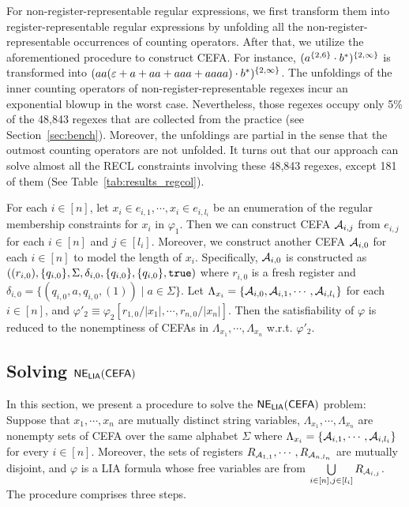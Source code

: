 For non-register-representable regular expressions, we first transform them into register-representable regular expressions by unfolding all the non-register-representable occurrences of counting operators. After that, we utilize the aforementioned procedure to construct CEFA. For instance, $(a^{\{2, 6\}} \cdot b^*)^{\{2,\infty\}}$ is transformed into $(aa(\varepsilon + a + aa + aaa+aaaa) \cdot b^*)^{\{2, \infty\}}$. 
The unfoldings of the inner counting operators of non-register-representable regexes incur an exponential blowup in the worst case. Nevertheless, those regexes occupy only 5\% of the 48,843 regexes that are collected from the practice (see Section~\ref{sec:bench}). Moreover, the unfoldings are partial in the sense that the outmost counting operators are not unfolded. 
It turns out that our approach can solve almost all the RECL constraints involving these 48,843 regexes, except 181 of them (See Table~\ref{tab:results_regcol}). 

For each $i \in [n]$, let $x_i \in e_{i, 1}, \cdots, x_i \in e_{i, l_i}$ be an enumeration of the regular membership constraints for $x_i$ in $\varphi_1$.  Then we can construct CEFA $\mathcal{A}_{i, j}$ from $e_{i, j}$ for each $i \in [n]$ and $j \in [l_i]$. Moreover, we construct another CEFA $\mathcal{A}_{i, 0}$ for each $i \in [n]$ to model the length of $x_i$. Specifically, $\mathcal{A}_{i,0}$ is constructed as $((r_{i,0}), \{q_{i,0}\}, \Sigma, \delta_{i,0}, \{q_{i,0}\}, \{q_{i,0}\}, \mathtt{true})$ where $r_{i,0}$ is a fresh register and $\delta_{i,0} = \{(q_{i,0}, a, q_{i,0}, (1)) \mid a \in \Sigma\}$. 
Let $\Lambda_{x_i} = \{\mathcal{A}_{i,0}, \mathcal{A}_{i, 1}, \cdots, \mathcal{A}_{i, l_i}\}$ for each $i \in [n]$, and $\varphi'_2 \equiv \varphi_2[r_{1,0}/|x_1|, \cdots, r_{n,0}/|x_n|]$. Then the satisfiability of $\varphi$ is reduced to the nonemptiness of CEFAs in $\Lambda_{x_1}, \cdots, \Lambda_{x_n}$ w.r.t. $\varphi'_2$.

\subsection{Solving ${\sf NE_{LIA}(CEFA)}$} \label{subsec:cefadec}

In this section, we present a procedure to solve the ${\sf NE_{LIA}(CEFA)}$ problem: Suppose that $x_1, \cdots, x_n$ are mutually distinct string variables, $\Lambda_{x_1}, \cdots, \Lambda_{x_n}$ are nonempty sets of CEFA over the same alphabet $\Sigma$ where $\Lambda_{x_i} = \{\mathcal{A}_{i, 1}, \cdots, \mathcal{A}_{i, l_i}\}$ for every $i \in [n]$. Moreover, the sets of registers $R_{\mathcal{A}_{1, 1}}, \cdots, R_{\mathcal{A}_{n, l_n}}$ are mutually disjoint, and $\varphi$ is a LIA formula whose free variables are from $\bigcup \limits_{i \in [n], j \in [l_i]} R_{\mathcal{A}_{i, j}}$. 
The procedure comprises three steps. 

